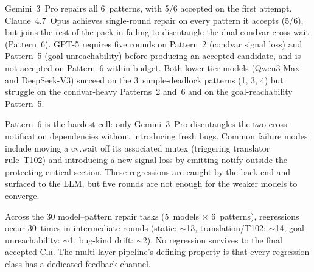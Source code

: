 Gemini~3~Pro repairs all 6~patterns, with 5/6 accepted on the first attempt. Claude~4.7~Opus achieves single-round repair on every pattern it accepts (5/6), but joins the rest of the pack in failing to disentangle the dual-condvar cross-wait (Pattern~6). GPT-5 requires five rounds on Pattern~2 (condvar signal loss) and Pattern~5 (goal-unreachability) before producing an accepted candidate, and is not accepted on Pattern~6 within budget. Both lower-tier models (Qwen3-Max and DeepSeek-V3) succeed on the 3~simple-deadlock patterns (1, 3, 4) but struggle on the condvar-heavy Patterns~2 and~6 and on the goal-reachability Pattern~5.

Pattern~6 is the hardest cell: only Gemini~3~Pro disentangles the two cross-notification dependencies without introducing fresh bugs. Common failure modes include moving a \textsf{cv.wait} off its associated mutex (triggering translator rule~T102) and introducing a new signal-loss by emitting \textsf{notify} outside the protecting critical section. These regressions are caught by the back-end and surfaced to the LLM, but five rounds are not enough for the weaker models to converge.

Across the 30 model--pattern repair tasks (5~models $\times$ 6~patterns), regressions occur 30~times in intermediate rounds (static: $\sim$13, translation/T102: $\sim$14, goal-unreachability: $\sim$1, bug-kind drift: $\sim$2). No regression survives to the final accepted \textsc{Cir}. The multi-layer pipeline's defining property is that every regression class has a dedicated feedback channel.


